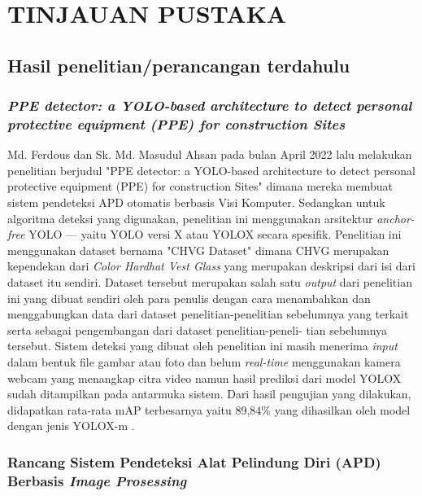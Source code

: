 \section{TINJAUAN PUSTAKA}

\subsection{Hasil penelitian/perancangan terdahulu}

\subsubsection{\emph{PPE detector: a YOLO-based architecture to detect personal protective equipment (PPE) for construction Sites}}
Md. Ferdous dan Sk. Md. Masudul Ahsan pada bulan April 2022 lalu melakukan penelitian berjudul "PPE detector: a YOLO-based architecture to detect personal protective equipment (PPE) for construction Sites" dimana mereka membuat sistem pendeteksi APD otomatis berbasis Visi Komputer. Sedangkan untuk algoritma deteksi yang digunakan, penelitian ini menggunakan arsitektur \emph{anchor-free} YOLO --- yaitu YOLO versi X atau YOLOX secara spesifik. Penelitian ini menggunakan dataset bernama "CHVG Dataset" dimana CHVG merupakan kependekan dari \emph{Color Hardhat Vest Glass} yang merupakan deskripsi dari isi dari dataset itu sendiri. Dataset tersebut merupakan salah satu \emph{output} dari penelitian ini yang dibuat sendiri oleh para penulis dengan cara menambahkan dan menggabungkan data dari dataset penelitian-penelitian sebelumnya yang terkait serta sebagai pengembangan dari dataset penelitian-peneli- tian sebelumnya tersebut. Sistem deteksi yang dibuat oleh penelitian ini masih menerima \emph{input} dalam bentuk file gambar atau foto dan belum \emph{real-time} menggunakan kamera webcam yang menangkap citra video namun hasil prediksi dari model YOLOX sudah ditampilkan pada antarmuka sistem. Dari hasil pengujian yang dilakukan, didapatkan rata-rata mAP terbesarnya yaitu 89,84\% yang dihasilkan oleh model dengan jenis YOLOX-m \cite{ferdous_ahsan_2022}.

\subsubsection{Rancang Sistem Pendeteksi Alat Pelindung Diri (APD) Berbasis \emph{Image Prosessing}}


